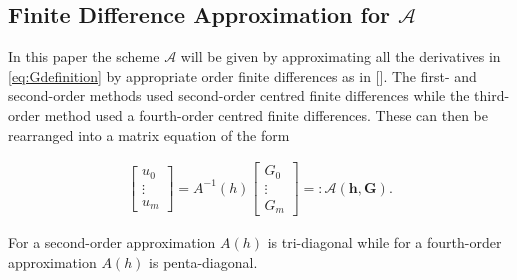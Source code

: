 \documentclass[SingleSpace,12pt,Proceedings]{Serre_ASCE}
\begin{document}
\subsection{Finite Difference Approximation for $\mathcal{A}$}
\label{section:ellipticA}
In this paper the scheme $\mathcal{A}$ will be given by approximating all the derivatives in \eqref{eq:Gdefinition} by appropriate order finite differences as in []. The first- and second-order methods used second-order centred finite differences while the third-order method used a fourth-order centred finite differences. These can then be rearranged into a matrix equation of the form
\begin{linenomath*}
\begin{gather*}
\left[\begin{array}{c}
  u_0 \\
  \vdots \\
  u_m \end{array}\right] = A^{-1}\left(h\right)
\left[\begin{array}{c}
 G_0 \\
 \vdots \\
 G_m \end{array}\right] =: \mathcal{A}(\boldsymbol{h},\boldsymbol{G}). 
\end{gather*}
\end{linenomath*}
For a second-order approximation $A\left(h\right)$ is tri-diagonal while for a fourth-order approximation $A\left(h\right)$ is penta-diagonal.
\end{document}
